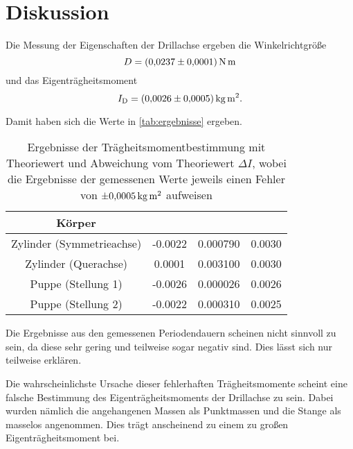 \section{Diskussion}
\label{sec:Diskussion}


Die Messung der Eigenschaften der Drillachse ergeben die Winkelrichtgröße
\begin{equation}
    D = \SI{0.0237+-0.0001}{\newton\meter}
\end{equation}
und das Eigenträgheitsmoment
\begin{equation}
    I_\text{D} = \SI{0.0026+-0.0005}{\kilo\gram\meter\squared}.
\end{equation}

Damit haben sich die Werte in \autoref{tab:ergebnisse} ergeben.

\begin{table}
    \centering
    \begin{tabular}{c S[table-format=-1.4] S[table-format=1.6] S[table-format=1.4]}
        \toprule
        Körper &  &  &  \\
        \midrule
        Zylinder (Symmetrieachse) & -0.0022 & 0.000790 & 0.0030 \\
        Zylinder (Querachse) & 0.0001 & 0.003100 & 0.0030 \\
        Puppe (Stellung 1) & -0.0026 & 0.000026 & 0.0026 \\
        Puppe (Stellung 2) & -0.0022 & 0.000310 & 0.0025 \\
        \bottomrule
    \end{tabular}
    \caption{Ergebnisse der Trägheitsmomentbestimmung mit Theoriewert und Abweichung vom Theoriewert $\Delta I$, wobei die Ergebnisse der gemessenen Werte jeweils einen Fehler von $\SI{+-0.0005}{\kilo\gram\meter\squared}$ aufweisen}
    \label{tab:ergebnisse}
\end{table}

Die Ergebnisse aus den gemessenen Periodendauern scheinen nicht sinnvoll zu sein, da diese sehr gering und teilweise sogar negativ sind.
Dies lässt sich nur teilweise erklären.

Die wahrscheinlichste Ursache dieser fehlerhaften Trägheitsmomente scheint eine falsche Bestimmung des Eigenträgheitsmoments der Drillachse zu sein.
Dabei wurden nämlich die angehangenen Massen als Punktmassen und die Stange als masselos angenommen.
Dies trägt anscheinend zu einem zu großen Eigenträgheitsmoment bei.

